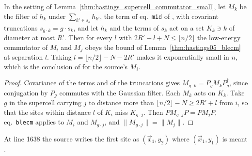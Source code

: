 \begin{theorem}
    \label{thm:hastings_supercell_truncated_small}
    \leanok
    In the setting of Lemma~\ref{thm:hastings_supercell_commutator_small}, let
    $M_k$ be the filter of $h_k$ under $\sum_{k'\in s_k}h_{k'}$, the term of
    eq.~\texttt{mid} of \cite[lines 285--307]{Hastings2006Solving}, with
    covariant truncations $s_{g\cdot k}=g\cdot s_k$, and let $h_k$ and the terms of
    $s_k$ act on a set $K_k\ni k$ of diameter at most $R'$. Then for every $l$
    with $2R'+l+N\le\lfloor n/2\rfloor$ the low-energy commutator of $M_i$ and
    $M_j$ obeys the bound of Lemma~\ref{thm:hastings05_blecm} at separation
    $l$. Taking $l=\lfloor n/2\rfloor-N-2R'$ makes it exponentially small in $n$,
    which is the conclusion of \cite[lines 1603--1641]{Hastings2006Solving} for
    the source's $M_i$.
\end{theorem}
\begin{proof}\leanok
    Covariance of the terms and of the truncations gives
    $M_{g\cdot k}=P_gM_kP_g^\dagger$, since conjugation by $P_g$ commutes with
    the Gaussian filter. Each $M_k$ acts on $K_k$. Take $g$ in the supercell
    carrying $j$ to distance more than $\lfloor n/2\rfloor-N\ge2R'+l$ from $i$, so
    that the sites within distance $l$ of $K_i$ miss $K_{g\cdot j}$. Then
    $PM_{g\cdot j}P=PM_jP$, eq.~\texttt{blecm} applies to $M_i$ and
    $M_{g\cdot j}$, and $\lVert M_{g\cdot j}\rVert=\lVert M_j\rVert$.
\end{proof}

At line 1638 the source writes the first site as $(\vec x_1,y_2)$ where
$(\vec x_1,y_1)$ is meant \cite{gap:hastings05_translation_supercell}.

